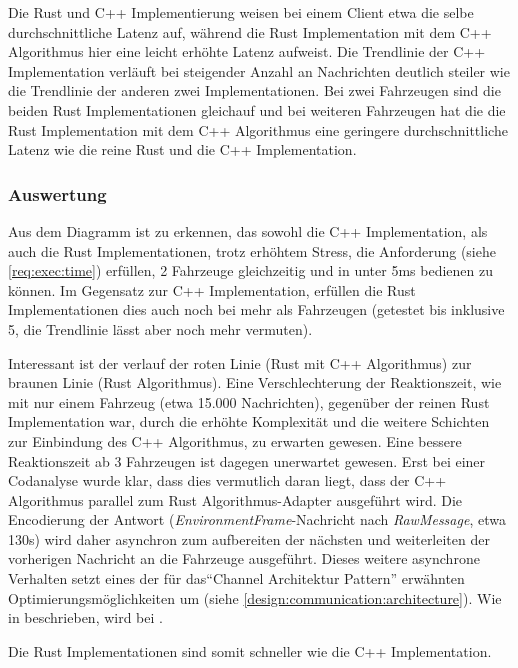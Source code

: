 Die Rust und C++ Implementierung weisen bei einem Client etwa die selbe durchschnittliche Latenz auf, während die Rust Implementation mit dem C++ Algorithmus hier eine leicht erhöhte Latenz aufweist.
Die Trendlinie der C++ Implementation verläuft bei steigender Anzahl an Nachrichten deutlich steiler wie die Trendlinie der anderen zwei Implementationen.
Bei zwei Fahrzeugen sind die beiden Rust Implementationen gleichauf und bei weiteren Fahrzeugen hat die die Rust Implementation mit dem C++ Algorithmus eine geringere durchschnittliche Latenz wie die reine Rust und die C++ Implementation.

\subsubsection{Auswertung}

Aus dem Diagramm ist zu erkennen, das sowohl die C++ Implementation, als auch die Rust Implementationen, trotz erhöhtem Stress, die Anforderung  (siehe \autoref{req:exec:time}) erfüllen, 2 Fahrzeuge gleichzeitig und in unter 5ms bedienen zu können.
Im Gegensatz zur C++ Implementation, erfüllen die Rust Implementationen dies auch noch bei mehr als  Fahrzeugen (getestet bis inklusive 5, die Trendlinie lässt aber noch mehr vermuten).

Interessant ist der verlauf der roten Linie (Rust mit C++ Algorithmus) zur braunen Linie (Rust Algorithmus).
Eine Verschlechterung der Reaktionszeit, wie mit nur einem Fahrzeug (etwa 15.000 Nachrichten), gegenüber der reinen Rust Implementation war, durch die erhöhte Komplexität und die weitere Schichten zur Einbindung des C++ Algorithmus, zu erwarten gewesen.
Eine bessere Reaktionszeit ab 3 Fahrzeugen ist dagegen unerwartet gewesen.
Erst bei einer Codanalyse wurde klar, dass dies vermutlich daran liegt, dass der C++ Algorithmus parallel zum Rust Algorithmus-Adapter ausgeführt wird.
Die Encodierung der Antwort (\textit{EnvironmentFrame}-Nachricht nach \textit{RawMessage}, etwa 130\textmu s) wird daher asynchron zum aufbereiten der nächsten und weiterleiten der vorherigen Nachricht an die Fahrzeuge ausgeführt.
Dieses weitere asynchrone Verhalten setzt eines der für das\enquote{Channel Architektur Pattern} erwähnten Optimierungsmöglichkeiten um (siehe \autoref{design:communication:architecture}).
Wie in  \cite[157]{douglass2003real} beschrieben, wird bei . 

Die Rust Implementationen sind somit schneller wie die C++ Implementation.

